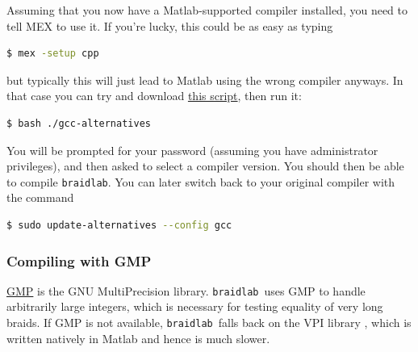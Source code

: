 \documentclass[12pt]{article}
\newcommand{\braidlab}{\texttt{braidlab}}%
\begin{document}
Assuming that you now have a Matlab-supported compiler installed, you need to
tell MEX %
%
to use it.  If you're lucky, this could be as easy as typing
\begin{lstlisting}[frame=single,framerule=0pt,escapechar=*,%
  language=bash,backgroundcolor=\color{white}]
$ mex -setup cpp
\end{lstlisting}
but typically this will just lead to Matlab using the wrong compiler anyways.
In that case you can try and download
\href{https://github.com/jeanluct/braidlab/raw/develop/devel/gcc-alternatives}{this
  script}, then run it:
\begin{lstlisting}[frame=single,framerule=0pt,escapechar=*,%
  language=bash,backgroundcolor=\color{white}]
$ bash ./gcc-alternatives
\end{lstlisting}
You will be prompted for your password (assuming you have administrator
privileges), and then asked to select a compiler version.  You should then be
able to compile \braidlab.  You can later switch back to your original
compiler with the command
\begin{lstlisting}[frame=single,framerule=0pt,escapechar=*,%
  language=bash,backgroundcolor=\color{white}]
$ sudo update-alternatives --config gcc
\end{lstlisting}

%
%


\subsubsection{Compiling with GMP}
\label{sec:gmp}

%
\href{https://gmplib.org/}{GMP} is the GNU MultiPrecision library.  \braidlab\
uses GMP to handle arbitrarily large integers, which is necessary for testing
equality of very long braids.  If GMP is not available, \braidlab\ falls back
on the VPI library \citep{vpi}, which is written natively in Matlab and hence
is much slower.
\end{document}
